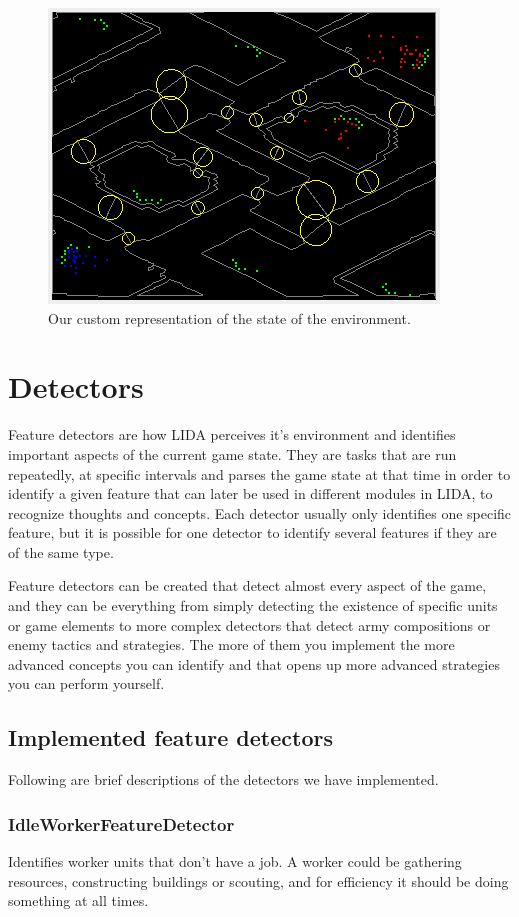 \begin{figure}[h!tb]
\centering
\includegraphics{graphics/environment-gui.png}
\caption{Our custom representation of the state of the environment.}
\label{fig:environment-gui}
\end{figure}

\section{Detectors}
\label{sec:detectors}
Feature detectors are how LIDA perceives it's environment and identifies important aspects of the current game state. They are tasks that are run repeatedly, at specific intervals and parses the game state at that time in order to identify a given feature that can later be used in different modules in LIDA, to recognize thoughts and concepts. Each detector usually only identifies one specific feature, but it is possible for one detector to identify several features if they are of the same type.

Feature detectors can be created that detect almost every aspect of the game, and they can be everything from simply detecting the existence of specific units or game elements to more complex detectors that detect army compositions or enemy tactics and strategies. The more of them you implement the more advanced concepts you can identify and that opens up more advanced strategies you can perform yourself.

\subsection{Implemented feature detectors}
Following are brief descriptions of the detectors we have implemented.

\subsubsection{IdleWorkerFeatureDetector}
Identifies worker units that don't have a job. A worker could be gathering resources, constructing buildings or scouting, and for efficiency it should be doing something at all times.

